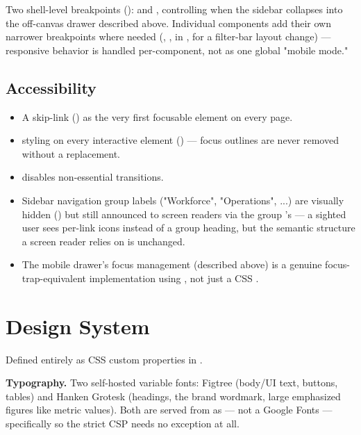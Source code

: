 Two shell-level breakpoints (): \code{768px} and
\code{1024px}, controlling when the sidebar collapses into the
off-canvas drawer described above. Individual components add their own
narrower breakpoints where needed (\code{720px}, \code{480px},
\code{420px} in , \code{900px} for a filter-bar
layout change) --- responsive behavior is handled per-component, not
as one global "mobile mode."

\subsection*{Accessibility}

\begin{itemize}[nosep]
  \item A skip-link ()
        as the very first focusable element on every page.
  \item {} styling on every interactive element
        () --- focus outlines are never removed without
        a replacement.
  \item {} disables
        non-essential transitions.
  \item Sidebar navigation group labels ("Workforce", "Operations", ...)
        are visually hidden () but still announced to
        screen readers via the group 's
         --- a sighted user sees per-link icons
        instead of a group heading, but the semantic structure a screen
        reader relies on is unchanged.
  \item The mobile drawer's focus management (described above) is a
        genuine focus-trap-equivalent implementation using ,
        not just a CSS .
\end{itemize}

\section{Design System}

Defined entirely as CSS custom properties in .

\textbf{Typography.} Two self-hosted variable fonts: Figtree (body/UI
text, buttons, tables) and Hanken Grotesk (headings, the brand
wordmark, large emphasized figures like metric values). Both are served
from  as  --- not a Google Fonts
 --- specifically so the strict CSP needs no
 exception at all.

